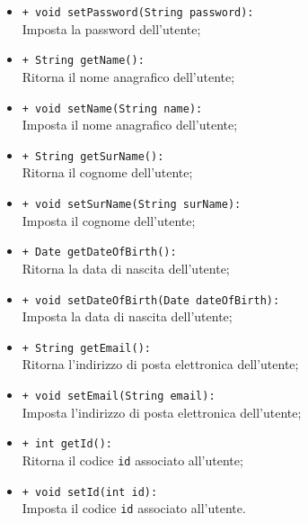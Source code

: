\begin{flushleft}
\begin{itemize}
\begin{sloppypar}
\begin{itemize}
\item \texttt{+ void setPassword(String password):}\\ Imposta la password dell'utente;
\item \texttt{+ String getName():}\\ Ritorna il nome anagrafico dell'utente;
\item \texttt{+ void setName(String name):}\\ Imposta il nome anagrafico dell'utente;
\item \texttt{+ String getSurName():}\\ Ritorna il cognome dell'utente;
\item \texttt{+ void setSurName(String surName):}\\ Imposta il cognome dell'utente;
\item \texttt{+ Date getDateOfBirth():}\\ Ritorna la data di nascita dell'utente;
\item \texttt{+ void setDateOfBirth(Date dateOfBirth):}\\ Imposta la data di nascita dell'utente;
\item \texttt{+ String getEmail():}\\ Ritorna l'indirizzo di posta elettronica dell'utente;
\item \texttt{+ void setEmail(String email):}\\ Imposta l'indirizzo di posta elettronica dell'utente;
\item \texttt{+ int getId():}\\ Ritorna il codice \texttt{id} associato all'utente;
\item \texttt{+ void setId(int id):}\\ Imposta il codice \texttt{id} associato all'utente.
\end{itemize}
\end{sloppypar}
\end{itemize}
\end{flushleft}

